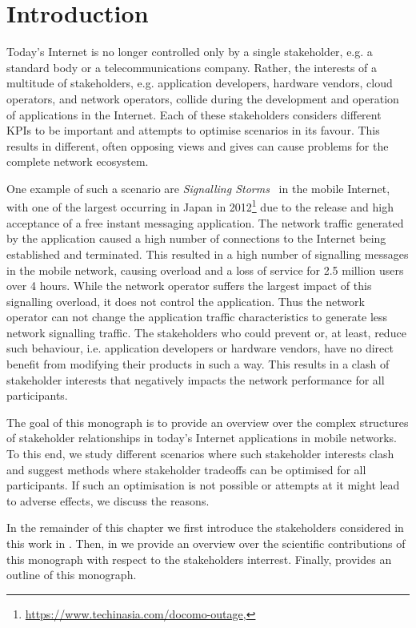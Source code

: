 \chapter{Introduction}\label{chap:introduction}

Today's Internet is no longer controlled only by a single stakeholder, e.g. a standard body or a telecommunications company.
Rather, the interests of a multitude of stakeholders, e.g. application developers, hardware vendors, cloud operators, and network operators, collide during the development and operation of applications in the Internet. 
Each of these stakeholders considers different \glspl{KPI} to be important and attempts to optimise scenarios in its favour.
This results in different, often opposing views and gives can cause problems for the complete network ecosystem. 

One example of such a scenario are \emph{Signalling Storms}~\cite{Huawei2011} in the mobile Internet, with one of the largest occurring in Japan in 2012\footnote{\url{https://www.techinasia.com/docomo-outage}, \accessed} due to the release and high acceptance of a free instant messaging application.
The network traffic generated by the application caused a high number of connections to the Internet being established and terminated.
This resulted in a high number of signalling messages in the mobile network, causing overload and a loss of service for 2.5 million users over 4 hours.
While the network operator suffers the largest impact of this signalling overload, it does not control the application.
Thus the network operator can not change the application traffic characteristics to generate less network signalling traffic. 
The stakeholders who could prevent or, at least, reduce such behaviour, i.e. application developers or hardware vendors, have no direct benefit from modifying their products in such a way.
This results in a clash of stakeholder interests that negatively impacts the network performance for all participants.

The goal of this monograph is to provide an overview over the complex structures of stakeholder relationships in today's Internet applications in mobile networks.
To this end, we study different scenarios where such stakeholder interests clash and suggest methods where stakeholder tradeoffs can be optimised for all participants.
If such an optimisation is not possible or attempts at it might lead to adverse effects, we discuss the reasons.

In the remainder of this chapter we first introduce the stakeholders considered in this work in .
Then, in  we provide an overview over the scientific contributions of this monograph with respect to the stakeholders interrest.
Finally,  provides an outline of this monograph.

